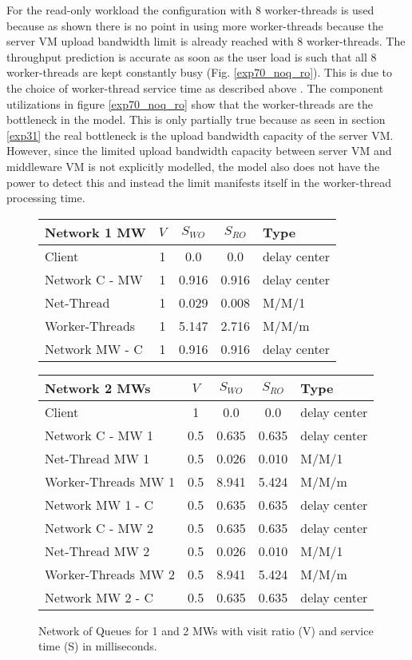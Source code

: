 \documentclass[report.tex]{subfiles}
\begin{document}
For the read-only workload the configuration with 8 worker-threads is used because as shown there is no point in using more worker-threads because the server VM upload bandwidth limit is already reached with 8 worker-threads. The throughput prediction is accurate as soon as the user load is such that all 8 worker-threads are kept constantly busy (Fig. \ref{exp70_noq_ro}). This is due to the choice of worker-thread service time as described above . The component utilizations in figure \ref{exp70_noq_ro} show that the worker-threads are the bottleneck in the model. This is only partially true because as seen in section \ref{exp31} the real bottleneck is the upload bandwidth capacity of the server VM. However, since the limited upload bandwidth capacity between server VM and middleware VM is not explicitly modelled, the model also does not have the power to detect this and instead the limit manifests itself in the worker-thread processing time.


\begin{figure}
	\centering
	\scriptsize{
		\setlength{\tabcolsep}{4.5pt}
		\begin{tabular}{|l|c|c|c|l|}
			\hline 
			\textbf{Network 1 MW} & $V$ & $S_{WO}$ &  $S_{RO}$ &Type \Tstrut\\ 
			\hline 
			Client & 1 & 0.0 & 0.0  & delay center \Tstrut\\ 
			\hline 
			Network C - MW & 1 & 0.916 & 0.916 & delay center \Tstrut\\  
			Net-Thread & 1 & 0.029 & 0.008 & M/M/1 \\ 
			Worker-Threads & 1 & 5.147 & 2.716 & M/M/m  \\ 
			Network MW - C & 1 & 0.916 & 0.916 & delay center \\ 
			\hline 
		\end{tabular} 
		\quad
		\setlength{\tabcolsep}{4.5pt}
		\begin{tabular}{|l|c|c|c|l|}
			\hline 
			\textbf{Network 2 MWs} & $V$ & $S_{WO}$ &  $S_{RO}$ & Type \Tstrut\\ 
			\hline 
			Client & 1 & 0.0 & 0.0 & delay center \Tstrut\\ 
			\hline 
			Network C - MW 1 & 0.5 & 0.635 & 0.635 & delay center \Tstrut\\ 
			Net-Thread MW 1 & 0.5 & 0.026 & 0.010 & M/M/1 \\ 
			Worker-Threads MW 1 & 0.5 & 8.941 & 5.424 & M/M/m  \\ 
			Network MW 1 - C & 0.5 & 0.635 & 0.635 & delay center \\ 
			\hline 
			Network C - MW 2 & 0.5 & 0.635 & 0.635 & delay center \Tstrut\\  
			Net-Thread MW 2 & 0.5 & 0.026 & 0.010 & M/M/1 \\ 
			Worker-Threads MW 2 & 0.5 & 8.941 & 5.424 & M/M/m  \\
			Network MW 2 - C & 0.5 & 0.635 & 0.635 & delay center \\ 
			\hline 
		\end{tabular}
	} 
	\caption{Network of Queues for 1 and 2 MWs with visit ratio (V) and service time (S) in milliseconds.}\label{exp70_noq}
\end{figure}
\end{document}
